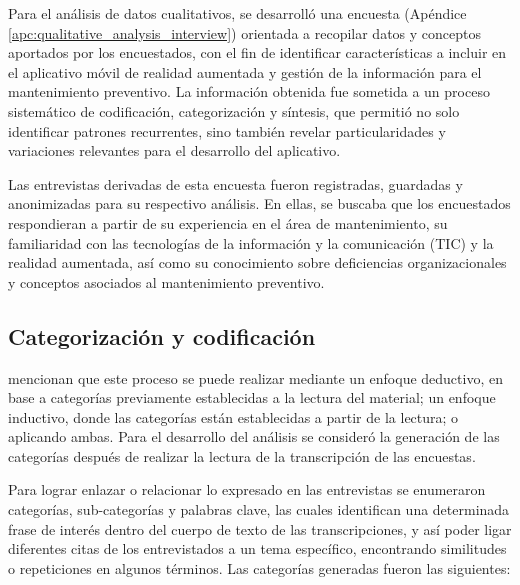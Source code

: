         Para el análisis de datos cualitativos, se desarrolló una encuesta (Apéndice \ref{apc:qualitative_analysis_interview}) orientada a recopilar datos y conceptos aportados por los encuestados, con el fin de identificar características a incluir en el aplicativo móvil de realidad aumentada y gestión de la información para el mantenimiento preventivo. La información obtenida fue sometida a un proceso sistemático de codificación, categorización y síntesis, que permitió no solo identificar patrones recurrentes, sino también revelar particularidades y variaciones relevantes para el desarrollo del aplicativo.

        Las entrevistas derivadas de esta encuesta fueron registradas, guardadas y anonimizadas para su respectivo análisis. En ellas, se buscaba que los encuestados respondieran a partir de su experiencia en el área de mantenimiento, su familiaridad con las tecnologías de la información y la comunicación (TIC) y la realidad aumentada, así como su conocimiento sobre deficiencias organizacionales y conceptos asociados al mantenimiento preventivo.

    \subsection{Categorización y codificación}

        \textcite{RODRIGUEZ:2005} mencionan que este proceso se puede realizar mediante un enfoque deductivo, en base a categorías previamente establecidas a la lectura del material; un enfoque inductivo, donde las categorías están establecidas a partir de la lectura; o aplicando ambas. Para el desarrollo del análisis se consideró la generación de las categorías después de realizar la lectura de la transcripción de las encuestas.

        Para lograr enlazar o relacionar lo expresado en las entrevistas se enumeraron categorías, sub-categorías y palabras clave, las cuales identifican una determinada frase de interés dentro del cuerpo de texto de las transcripciones, y así poder ligar diferentes citas de los entrevistados a un tema específico, encontrando similitudes o repeticiones en algunos términos. Las categorías generadas fueron las siguientes:

